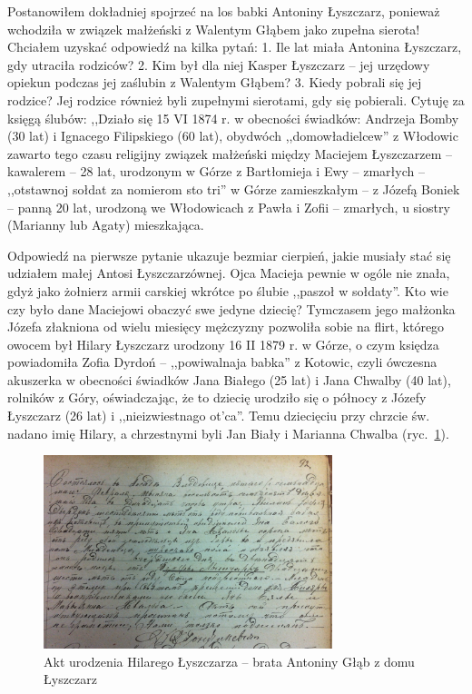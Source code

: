 Postanowiłem dokładniej spojrzeć na los babki Antoniny Łyszczarz, ponieważ wchodziła w związek małżeński z Walentym Głąbem jako zupełna sierota! Chciałem uzyskać odpowiedź na kilka pytań: 1. Ile lat miała Antonina Łyszczarz, gdy utraciła rodziców? 2. Kim był dla niej Kasper Łyszczarz – jej urzędowy opiekun podczas jej zaślubin z Walentym Głąbem? 3. Kiedy pobrali się jej rodzice? Jej rodzice również byli zupełnymi sierotami, gdy się pobierali. Cytuję za księgą ślubów: ,,Działo się 15 VI 1874 r. w obecności świadków: Andrzeja Bomby (30 lat) i Ignacego Filipskiego (60 lat), obydwóch ,,domowładielcew'' z Włodowic zawarto tego czasu religijny związek małżeński między Maciejem Łyszczarzem -- kawalerem -- 28 lat, urodzonym w Górze z Bartłomieja i Ewy -- zmarłych -- ,,otstawnoj sołdat za nomierom sto tri'' w Górze zamieszkałym – z Józefą Boniek – panną 20 lat, urodzoną we Włodowicach z Pawła i Zofii -- zmarłych, u siostry (Marianny lub Agaty) mieszkająca.

Odpowiedź na pierwsze pytanie ukazuje bezmiar cierpień, jakie musiały stać się udziałem małej Antosi Łyszczarzównej. Ojca Macieja pewnie w ogóle nie znała, gdyż jako żołnierz armii carskiej wkrótce po ślubie ,,paszoł w sołdaty''. Kto wie czy było dane Maciejowi obaczyć swe jedyne dziecię? Tymczasem jego małżonka Józefa złakniona od wielu miesięcy mężczyzny pozwoliła sobie na flirt, którego owocem był Hilary Łyszczarz urodzony 16 II 1879 r. w Górze, o czym księdza powiadomiła Zofia Dyrdoń -- ,,powiwalnaja babka'' z Kotowic, czyli ówczesna akuszerka w obecności świadków Jana Białego (25 lat) i Jana Chwalby (40 lat), rolników z Góry, oświadczając, że to dziecię urodziło się o północy z Józefy Łyszczarz (26 lat) i ,,nieizwiestnago ot'ca''. Temu dziecięciu przy chrzcie św. nadano imię Hilary, a chrzestnymi byli Jan Biały i Marianna Chwalba (ryc.~\ref{rys:akt_urodzenia_hilarego_lyszczarza}).


\begin{figure}[!h]
\begin{center}
\includegraphics[width=0.75\textwidth]{zdjecia/akt_urodzenia_hilarego_lyszczarza.jpg}
\caption[Akt urodzenia Hilarego Łyszczarza]{Akt urodzenia Hilarego Łyszczarza -- brata Antoniny Głąb z domu Łyszczarz}
\label{rys:akt_urodzenia_hilarego_lyszczarza}
\end{center}
\end{figure}

